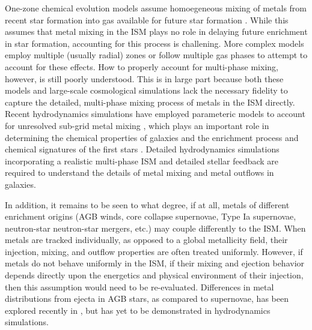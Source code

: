 \documentclass[twocolumn]{aastex61}
\begin{document}
One-zone chemical evolution models assume homoegeneous mixing of metals from recent star formation into gas available for future star formation \citep[e.g.][]{Lanfranchi2006b,Kirby2011-III,Cote2017,Andrews2017}. While this assumes that metal mixing in the ISM plays no role in delaying future enrichment in star formation, accounting for this process is challening. More complex models \citep[e.g.][]{SchonrichBinney2009,Pezzulli2016} employ multiple (usually radial) zones or follow multiple gas phases to attempt to account for these effects. How to properly account for multi-phase mixing, however, is still poorly understood. This is in large part because both these models and large-scale cosmological simulations lack the necessary fidelity to capture the detailed, multi-phase mixing process of metals in the ISM directly. 
Recent hydrodynamics simulations have employed parameteric models to account for unresolved sub-grid metal mixing \citep{PanScannapiecoScalo2013,Sarmento2017}, which plays an important role in determining the chemical properties of galaxies \citep[e.g.][]{Shen2010, Pilkington2012, Few2012, Brook2014, FengKrumholz2014, Escala2018, Armillotta2018} and the enrichment process and chemical signatures of the first stars \citep[e.g.][]{Jeon2015,Ritter2015,Smith2015}. Detailed hydrodynamics simulations incorporating a realistic multi-phase ISM and detailed stellar feedback are required to understand the details of metal mixing and metal outflows in galaxies.

In addition, it remains to be seen to what degree, if at all, metals of different enrichment origins (AGB winds, core collapse supernovae, Type Ia supernovae, neutron-star neutron-star mergers, etc.) may couple differently to the ISM. When metals are tracked individually, as opposed to a global metallicity field, their injection, mixing, and outflow properties are often treated uniformly. However, if metals do not behave uniformly in the ISM, if their mixing and ejection behavior depends directly upon the energetics and physical environment of their injection, then this assumption would need to be re-evaluated. Differences in metal distributions from ejecta in AGB stars, as compared to supernovae, has been explored recently in \cite{KrumholzTing2018}, but has yet to be demonstrated in hydrodynamics simulations.
\end{document}
